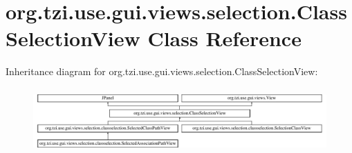 \hypertarget{classorg_1_1tzi_1_1use_1_1gui_1_1views_1_1selection_1_1_class_selection_view}{\section{org.\-tzi.\-use.\-gui.\-views.\-selection.\-Class\-Selection\-View Class Reference}
\label{classorg_1_1tzi_1_1use_1_1gui_1_1views_1_1selection_1_1_class_selection_view}
}
Inheritance diagram for org.\-tzi.\-use.\-gui.\-views.\-selection.\-Class\-Selection\-View\-:\begin{figure}[H]
\begin{center}
\leavevmode
\includegraphics[height=2.522522cm]{classorg_1_1tzi_1_1use_1_1gui_1_1views_1_1selection_1_1_class_selection_view}
\end{center}
\end{figure}
